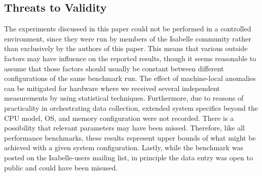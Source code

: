 \subsection{Threats to Validity}
The experiments discussed in this paper could not be performed in a controlled environment,
since they were run by members of the Isabelle community rather than exclusively by the authors of this paper.
This means that various outside factors may have influence on the reported results,
though it seems reasonable to assume that those factors should usually be constant between different configurations of the same benchmark run.
The effect of machine-local anomalies can be mitigated for hardware where we received several independent measurements by using statistical techniques.
Furthermore,
due to reasons of practicality in orchestrating data collection,
extended system specifics beyond the CPU model, OS, and memory configuration were not recorded.
There is a possibility that relevant parameters may have been missed.
Therefore, like all performance benchmarks, these results represent upper bounds of what might be achieved with a given system configuration.
Lastly,
while the benchmark was posted on the Isabelle-users mailing list,
in principle the data entry was open to public and could have been misused.